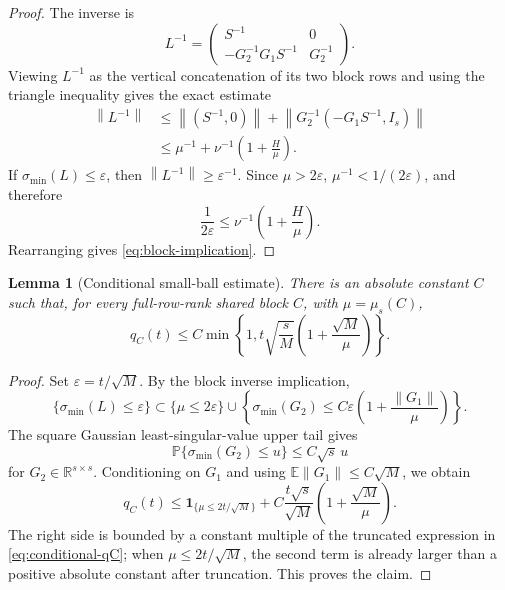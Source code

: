 \documentclass[11pt]{article}
\newtheorem{lemma}{Lemma}
\newcommand{\R}{\mathbb R}
\newcommand{\Pbb}{\mathbb P}
\newcommand{\Ebb}{\mathbb E}
\newcommand{\1}{\mathbf 1}
\newcommand{\norm}[1]{\left\lVert #1\right\rVert}
\newcommand{\smin}{\sigma_{\min}}
\newcommand{\eps}{\varepsilon}
\begin{document}
\begin{proof}
The inverse is
\[
        L^{-1}
        =
        \begin{pmatrix}
        S^{-1}&0\\
        -G_2^{-1}G_1S^{-1}&G_2^{-1}
        \end{pmatrix}.
\]
Viewing \(L^{-1}\) as the vertical concatenation of its two block rows and using
the triangle inequality gives the exact estimate
\begin{align*}
        \norm{L^{-1}}
        &\le
        \norm{(S^{-1},0)}
        +
        \norm{G_2^{-1}(-G_1S^{-1},I_s)}
        \\
        &\le
        \mu^{-1}
        +
        \nu^{-1}\left(1+\frac{H}{\mu}\right).
\end{align*}
If \(\smin(L)\le\eps\), then \(\norm{L^{-1}}\ge\eps^{-1}\).  Since \(\mu>2\eps\),
\(\mu^{-1}<1/(2\eps)\), and therefore
\[
        \frac{1}{2\eps}
        \le
        \nu^{-1}\left(1+\frac{H}{\mu}\right).
\]
Rearranging gives \eqref{eq:block-implication}.
\end{proof}

\begin{lemma}[Conditional small-ball estimate]
There is an absolute constant \(C\) such that, for every full-row-rank shared block \(C\),
with \(\mu=\mu_s(C)\),
\begin{equation}
        q_C(t)
        \le
        C\min\left\{
        1,
        t\sqrt{\frac{s}{M}}
        \left(1+\frac{\sqrt M}{\mu}\right)
        \right\}.
        \label{eq:conditional-qC}
\end{equation}
\end{lemma}

\begin{proof}
Set \(\eps=t/\sqrt M\).  By the block inverse implication,
\[
        \{\smin(L)\le\eps\}
        \subset
        \{\mu\le2\eps\}
        \cup
        \left\{
        \smin(G_2)
        \le
        C\eps\left(1+\frac{\norm{G_1}}{\mu}\right)
        \right\}.
\]
The square Gaussian least-singular-value upper tail gives
\[
        \Pbb\{\smin(G_2)\le u\}\le C\sqrt s\,u
\]
for \(G_2\in\R^{s\times s}\).  Conditioning on \(G_1\) and using
\(\Ebb\norm{G_1}\le C\sqrt M\), we obtain
\[
        q_C(t)
        \le
        \1_{\{\mu\le2t/\sqrt M\}}
        +
        C\frac{t\sqrt s}{\sqrt M}
        \left(1+\frac{\sqrt M}{\mu}\right).
\]
The right side is bounded by a constant multiple of the truncated expression in
\eqref{eq:conditional-qC}; when \(\mu\le2t/\sqrt M\), the second term is already larger
than a positive absolute constant after truncation.  This proves the claim.
\end{proof}
\end{document}
